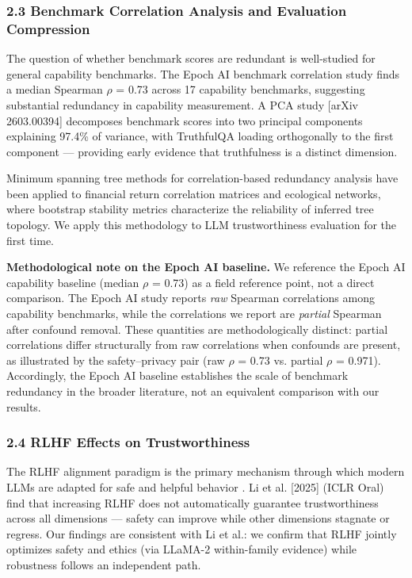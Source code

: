\subsubsection{2.3 Benchmark Correlation Analysis and Evaluation Compression}

The question of whether benchmark scores are redundant is well-studied for general capability benchmarks. The Epoch AI benchmark correlation study finds a median Spearman $\rho$ = 0.73 across 17 capability benchmarks, suggesting substantial redundancy in capability measurement. A PCA study [arXiv 2603.00394] decomposes benchmark scores into two principal components explaining 97.4\% of variance, with TruthfulQA loading orthogonally to the first component --- providing early evidence that truthfulness is a distinct dimension.

Minimum spanning tree methods for correlation-based redundancy analysis have been applied to financial return correlation matrices \citep{Tumminello2007MST} and ecological networks, where bootstrap stability metrics characterize the reliability of inferred tree topology. We apply this methodology to LLM trustworthiness evaluation for the first time.

\textbf{Methodological note on the Epoch AI baseline.} We reference the Epoch AI capability baseline (median $\rho$ = 0.73) as a field reference point, not a direct comparison. The Epoch AI study reports \textit{raw} Spearman correlations among capability benchmarks, while the correlations we report are \textit{partial} Spearman after confound removal. These quantities are methodologically distinct: partial correlations differ structurally from raw correlations when confounds are present, as illustrated by the safety--privacy pair (raw $\rho$ = 0.73 vs. partial $\rho$ = 0.971). Accordingly, the Epoch AI baseline establishes the scale of benchmark redundancy in the broader literature, not an equivalent comparison with our results.

\subsubsection{2.4 RLHF Effects on Trustworthiness}

The RLHF alignment paradigm is the primary mechanism through which modern LLMs are adapted for safe and helpful behavior \citep{Ouyang2022InstructGPT}. Li et al. [2025] (ICLR Oral) find that increasing RLHF does not automatically guarantee trustworthiness across all dimensions --- safety can improve while other dimensions stagnate or regress. Our findings are consistent with Li et al.: we confirm that RLHF jointly optimizes safety and ethics (via LLaMA-2 within-family evidence) while robustness follows an independent path.

